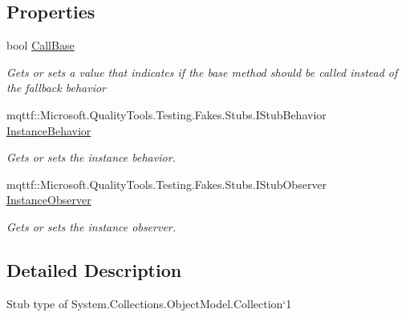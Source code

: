 \subsection*{Properties}
\begin{DoxyCompactItemize}
\item 
bool \hyperlink{class_system_1_1_collections_1_1_object_model_1_1_fakes_1_1_stub_collection_3_01_t_01_4_a50a2b1ccac0a672b6771324aeed15529}{Call\-Base}
\begin{DoxyCompactList}\small\item\em Gets or sets a value that indicates if the base method should be called instead of the fallback behavior\end{DoxyCompactList}\item 
mqttf\-::\-Microsoft.\-Quality\-Tools.\-Testing.\-Fakes.\-Stubs.\-I\-Stub\-Behavior \hyperlink{class_system_1_1_collections_1_1_object_model_1_1_fakes_1_1_stub_collection_3_01_t_01_4_af2007b0e715798d1b387b011317f774f}{Instance\-Behavior}
\begin{DoxyCompactList}\small\item\em Gets or sets the instance behavior.\end{DoxyCompactList}\item 
mqttf\-::\-Microsoft.\-Quality\-Tools.\-Testing.\-Fakes.\-Stubs.\-I\-Stub\-Observer \hyperlink{class_system_1_1_collections_1_1_object_model_1_1_fakes_1_1_stub_collection_3_01_t_01_4_a0707340cd26fe2b9fc059439f6b8c857}{Instance\-Observer}
\begin{DoxyCompactList}\small\item\em Gets or sets the instance observer.\end{DoxyCompactList}\end{DoxyCompactItemize}


\subsection{Detailed Description}
Stub type of System.\-Collections.\-Object\-Model.\-Collection`1



